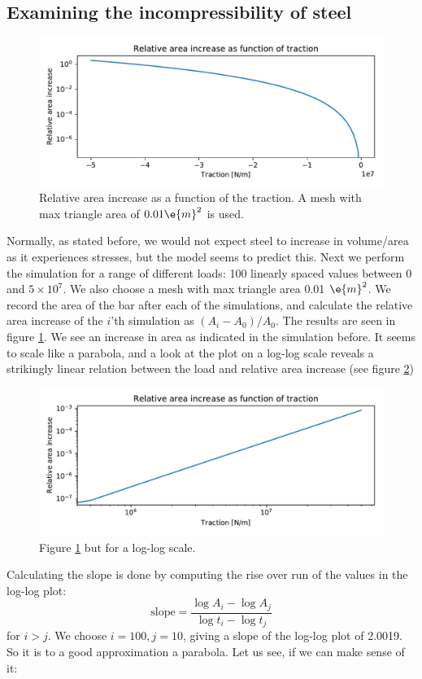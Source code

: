 \documentclass[sigconf]{acmart}
\begin{document}
\subsection{Examining the incompressibility of steel}
\begin{figure}
	\centering
	\includegraphics[width=\linewidth]{ex_loads.pdf}
	\caption{Relative area increase as a function of the traction. A mesh with max triangle area of $ 0.01 \e{m}^2 $ is used.}
	\label{fig:loads}
\end{figure}
Normally, as stated before, we would not expect steel to increase in volume/area as it experiences stresses, but the model seems to predict this. Next we perform the simulation for a range of different loads: 100 linearly spaced values between 0 and $ 5\times 10^7 $. We also choose a mesh with max triangle area 0.01 $ \e{m}^2 $. We record the area of the bar after each of the simulations, and calculate the relative area increase of the $ i $'th simulation as $ (A_i-A_0)/A_0 $. The results are seen in figure \ref{fig:loads}. We see an increase in area as indicated in the simulation before. It seems to scale like a parabola, and a look at the plot on a log-log scale reveals a strikingly linear relation between the load and relative area increase (see figure \ref{fig:logloads})
\begin{figure}
	\centering
	\includegraphics[width=\linewidth]{ex_logloads.pdf}
	\caption{Figure \ref{fig:loads} but for a log-log scale.}
	\label{fig:logloads}
\end{figure}
Calculating the slope is done by computing the rise over run of the values in the log-log plot:
\begin{equation}\label{key}
	\text{slope} = \frac{\log A_i - \log A_j}{\log t_i - \log t_j}
\end{equation}
for $ i > j $. We choose $ i=100, j=10 $, giving a slope of the log-log plot of 2.0019. So it is to a good approximation a parabola. Let us see, if we can make sense of it:
\end{document}
